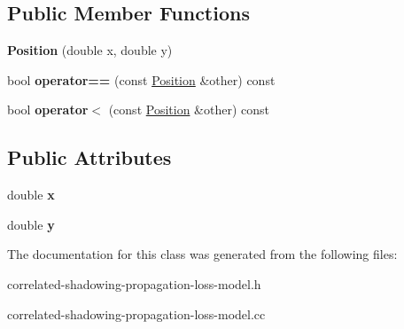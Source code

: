 \subsection*{Public Member Functions}
\begin{DoxyCompactItemize}
\item 
\mbox{\label{classns3_1_1lorawan_1_1CorrelatedShadowingPropagationLossModel_1_1Position_a4928d4e50ae9a4b40f8828a9de11337c}} 
{\bfseries Position} (double x, double y)
\item 
\mbox{\label{classns3_1_1lorawan_1_1CorrelatedShadowingPropagationLossModel_1_1Position_a9024509b182a60959292551c3eecd7e8}} 
bool {\bfseries operator==} (const \hyperlink{classns3_1_1lorawan_1_1CorrelatedShadowingPropagationLossModel_1_1Position}{Position} \&other) const
\item 
\mbox{\label{classns3_1_1lorawan_1_1CorrelatedShadowingPropagationLossModel_1_1Position_add48dd56a0d777cb95a7a9c40c2c22b4}} 
bool {\bfseries operator$<$} (const \hyperlink{classns3_1_1lorawan_1_1CorrelatedShadowingPropagationLossModel_1_1Position}{Position} \&other) const
\end{DoxyCompactItemize}
\subsection*{Public Attributes}
\begin{DoxyCompactItemize}
\item 
\mbox{\label{classns3_1_1lorawan_1_1CorrelatedShadowingPropagationLossModel_1_1Position_a98eacfe604596bfe090e30f5a7673963}} 
double {\bfseries x}
\item 
\mbox{\label{classns3_1_1lorawan_1_1CorrelatedShadowingPropagationLossModel_1_1Position_ac2c7b202811be44177cc7f39d5e75abc}} 
double {\bfseries y}
\end{DoxyCompactItemize}


The documentation for this class was generated from the following files\+:\begin{DoxyCompactItemize}
\item 
correlated-\/shadowing-\/propagation-\/loss-\/model.\+h\item 
correlated-\/shadowing-\/propagation-\/loss-\/model.\+cc\end{DoxyCompactItemize}
